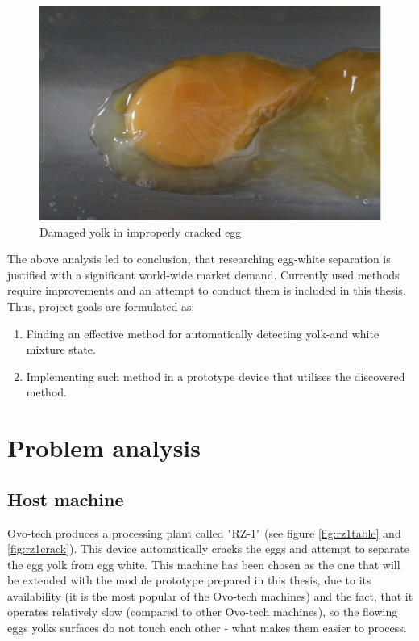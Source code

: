 \documentclass[12pt,twoside,a4paper]{article}
\begin{document}
 
\begin{figure}[H]
\centering
\includegraphics[width=0.4\paperwidth]{damg}
\caption{Damaged yolk in improperly cracked egg}\label{fig:damg}
\end{figure}


The above analysis led to conclusion, that researching egg-white separation is justified with a significant world-wide market demand. Currently used methods require improvements and an attempt to conduct them is included in this thesis. Thus, project goals are formulated as:
\begin{enumerate}
\item Finding an effective method for automatically detecting yolk-and white mixture state.
\item Implementing such method in a prototype device that utilises the discovered method.
\end{enumerate}


\section{Problem analysis}
\subsection{Host machine}
Ovo-tech produces a processing plant called "RZ-1" (see figure \ref{fig:rz1table} and \ref{fig:rz1crack}).
This device automatically cracks the eggs and attempt to separate the egg yolk from egg white. This machine has been chosen as the one that will be extended with the module prototype prepared in this thesis, due to its availability (it is the most popular of the Ovo-tech machines) and the fact, that it operates relatively slow (compared to other Ovo-tech machines), so the flowing eggs yolks surfaces do not touch each other - what makes them easier to process.
\end{document}
